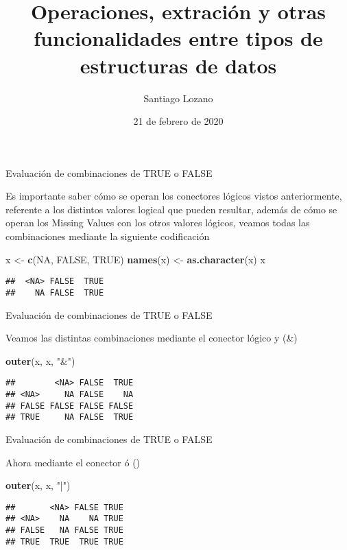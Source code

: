 \documentclass[ignorenonframetext,]{beamer}
\title{Operaciones, extración y otras funcionalidades entre tipos de
estructuras de datos}
\author{Santiago Lozano}
\date{21 de febrero de 2020}
\newenvironment{Shaded}{\begin{snugshade}}{\end{snugshade}}
\newcommand{\KeywordTok}[1]{\textcolor[rgb]{0.13,0.29,0.53}{\textbf{#1}}}
\newcommand{\StringTok}[1]{\textcolor[rgb]{0.31,0.60,0.02}{#1}}
\newcommand{\OtherTok}[1]{\textcolor[rgb]{0.56,0.35,0.01}{#1}}
\newcommand{\NormalTok}[1]{#1}
\begin{document}
\frame{\titlepage}

\begin{frame}[fragile]{Evaluación de combinaciones de TRUE o FALSE}

Es importante saber cómo se operan los conectores lógicos
vistos anteriormente, referente a los distintos valores logical que
pueden resultar, además de cómo se operan los Missing Values con los
otros valores lógicos, veamos todas las combinaciones mediante la
siguiente codificación

\begin{Shaded}
\begin{Highlighting}[]
\NormalTok{x <-}\StringTok{ }\KeywordTok{c}\NormalTok{(}\OtherTok{NA}\NormalTok{, }\OtherTok{FALSE}\NormalTok{, }\OtherTok{TRUE}\NormalTok{)}
\KeywordTok{names}\NormalTok{(x) <-}\StringTok{ }\KeywordTok{as.character}\NormalTok{(x)}
\NormalTok{x}
\end{Highlighting}
\end{Shaded}

\begin{verbatim}
##  <NA> FALSE  TRUE 
##    NA FALSE  TRUE
\end{verbatim}

\end{frame}

\begin{frame}[fragile]{Evaluación de combinaciones de TRUE o FALSE}

Veamos las distintas combinaciones mediante el conector lógico y (\&)

\begin{Shaded}
\begin{Highlighting}[]
\KeywordTok{outer}\NormalTok{(x, x, }\StringTok{"&"}\NormalTok{)}
\end{Highlighting}
\end{Shaded}

\begin{verbatim}
##        <NA> FALSE  TRUE
## <NA>     NA FALSE    NA
## FALSE FALSE FALSE FALSE
## TRUE     NA FALSE  TRUE
\end{verbatim}

\end{frame}

\begin{frame}[fragile]{Evaluación de combinaciones de TRUE o FALSE}

Ahora mediante el conector ó (\textbar{})

\begin{Shaded}
\begin{Highlighting}[]
\KeywordTok{outer}\NormalTok{(x, x, }\StringTok{"|"}\NormalTok{)}
\end{Highlighting}
\end{Shaded}

\begin{verbatim}
##       <NA> FALSE TRUE
## <NA>    NA    NA TRUE
## FALSE   NA FALSE TRUE
## TRUE  TRUE  TRUE TRUE
\end{verbatim}

\end{frame}
\end{document}
